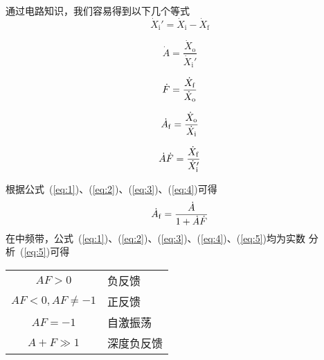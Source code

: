 \documentclass[cn,pad,11pt,geye]{elegantnote}
\begin{document}
通过电路知识，我们容易得到以下几个等式
\begin{equation*}
	\dot X_\mathrm{i}'=\dot X_\mathrm{i}-\dot X_\mathrm{f}
\end{equation*}
\begin{definition}[基本放大电路的放大倍数]
	\begin{equation}
		\dot{A}=\frac{\dot{X}_{\mathrm{o}}}{\dot{X}_{\mathrm{i}}'}\label{eq:1}
	\end{equation}
\end{definition}

\begin{definition}[反馈系数]
	\begin{equation}
		\dot{F}=\frac{\dot{X}_{\rm{f}}}{\dot{X}_{\rm{o}}}\label{eq:2}
	\end{equation}
\end{definition}

\begin{definition}
	\begin{equation}
		\dot{A}_{\rm{f}}=\frac{\dot{X}_{\rm{o}}}{\dot{X}_{\rm{i}}}\label{eq:3}
	\end{equation}
\end{definition}

\begin{definition}[电路的环路放大倍数]
	\begin{equation}
		\dot{A}\dot{F}=\frac{\dot{X}_{\rm{f}}}{\dot{X}_{\rm{i}}'}\label{eq:4}
	\end{equation}
\end{definition}
根据公式~(\ref{eq:1})、(\ref{eq:2})、(\ref{eq:3})、(\ref{eq:4})可得
\begin{equation}
	\dot{A}_{\rm{f}}=\frac{\dot{A}}{1+\dot{A}\dot{F}}\label{eq:5}
\end{equation}
在中频带，公式~(\ref{eq:1})、(\ref{eq:2})、(\ref{eq:3})、(\ref{eq:4})、(\ref{eq:5})均为实数
分析~(\ref{eq:5})可得
\begin{table}[ht]
	\centering
	\begin{tabular}{cl}
		$AF>0$ & 负反馈\\
		$AF<0,AF\ne-1$ & 正反馈\\
		$AF=-1$ & 自激振荡\\
		$A+F\gg1$ & 深度负反馈
	\end{tabular}
\end{table}
\end{document}

